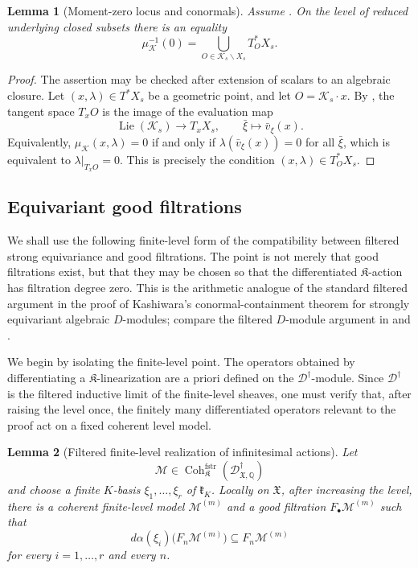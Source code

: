 \documentclass[11pt]{amsart}
\theoremstyle{plain}
\newtheorem{lemma}{Lemma}[section]
\theoremstyle{definition}
\theoremstyle{remark}
\newcommand{\Coh}{\operatorname{Coh}}
\newcommand{\Lie}{\operatorname{Lie}}
\newcommand{\fstr}{\mathrm{fstr}}
\begin{document}
\begin{lemma}[Moment-zero locus and conormals]
\label{lem:moment-zero-conormals}
Assume .  On the level of reduced underlying
closed subsets there is an equality
\[
  \mu_{\mathcal K}^{-1}(0)
  =
  \bigcup_{O\in \mathcal K_s\backslash X_s}T^*_O X_s.
\]
\end{lemma}

\begin{proof}
The assertion may be checked after extension of scalars to an algebraic
closure.  Let \((x,\lambda)\in T^*X_s\) be a geometric point, and let
\(O=\mathcal K_s\cdot x\).  By , the tangent
space \(T_xO\) is the image of the evaluation map
\[
  \Lie(\mathcal K_s)\longrightarrow T_xX_s,
  \qquad
  \bar\xi\longmapsto \bar v_\xi(x).
\]
Equivalently, \(\mu_{\mathcal K}(x,\lambda)=0\) if and only if
\(\lambda(\bar v_\xi(x))=0\) for all \(\bar\xi\), which is equivalent to
\(\lambda|_{T_xO}=0\).  This is precisely the condition
\((x,\lambda)\in T^*_O X_s\).
\end{proof}


\subsection{Equivariant good filtrations}

We shall use the following finite-level form of the compatibility between
filtered strong equivariance and good filtrations. The point is not merely that good
filtrations exist, but that they may be chosen so that the differentiated
\(\mathfrak K\)-action has filtration degree zero. This is the arithmetic
analogue of the standard filtered argument in the proof of Kashiwara's
conormal-containment theorem for strongly equivariant algebraic \(D\)-modules; compare
the filtered \(D\)-module argument in \cite[Section 1.2]{HottaTakeuchiTanisaki}
and \cite[Section 1.2]{ChrissGinzburg}.

We begin by isolating the finite-level point. The operators obtained by
differentiating a \(\mathfrak K\)-linearization are a priori defined on the
\(\mathscr D^\dagger\)-module. Since \(\mathscr D^\dagger\) is the filtered
inductive limit of the finite-level sheaves, one must verify that, after
raising the level once, the finitely many differentiated operators relevant to
the proof act on a fixed coherent level model.


\begin{lemma}[Filtered finite-level realization of infinitesimal actions]
\label{lem:finite-level-infinitesimal-realization}
Let
\[
  \mathcal M\in
  \Coh^{\fstr}_{\mathfrak K}
  (\mathscr D^\dagger_{\mathfrak X,\mathbb Q})
\]
and choose a finite \(K\)-basis \(\xi_1,\ldots,\xi_r\) of
\(\mathfrak k_K\).  Locally on \(\mathfrak X\), after increasing the level,
there is a coherent finite-level model \(\mathcal M^{(m)}\) and a good
filtration \(F_\bullet\mathcal M^{(m)}\) such that
\[
  d\alpha(\xi_i)\bigl(F_n\mathcal M^{(m)}\bigr)
  \subseteq F_n\mathcal M^{(m)}
\]
for every \(i=1,\ldots,r\) and every \(n\).
\end{lemma}
\end{document}
